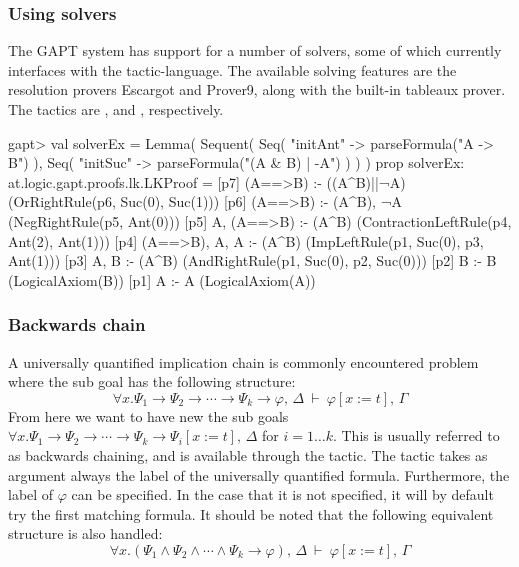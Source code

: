 \documentclass{article}
\newcommand{\cli}[1]{{\ttfamily {#1}}}
\def\fCenter{\ \vdash\ }
\begin{document}
\subsubsection*{Using solvers}
The GAPT system has support for a number of solvers, some of which currently interfaces with the tactic-language. The available solving features are the resolution provers Escargot and Prover9, along with the built-in tableaux prover. The tactics are \cli{escargot}, \cli{prover9} and \cli{prop}, respectively. 

\begin{clilisting}
gapt> val solverEx = Lemma( Sequent( Seq( "initAnt" -> parseFormula("A -> B") ), Seq( "initSuc" -> parseFormula("(A & B) | -A") ) ) ) { prop }
solverEx: at.logic.gapt.proofs.lk.LKProof =
[p7] (A==>B) :- ((A^B)||¬A)    (OrRightRule(p6, Suc(0), Suc(1)))
[p6] (A==>B) :- (A^B), ¬A    (NegRightRule(p5, Ant(0)))
[p5] A, (A==>B) :- (A^B)    (ContractionLeftRule(p4, Ant(2), Ant(1)))
[p4] (A==>B), A, A :- (A^B)    (ImpLeftRule(p1, Suc(0), p3, Ant(1)))
[p3] A, B :- (A^B)    (AndRightRule(p1, Suc(0), p2, Suc(0)))
[p2] B :- B    (LogicalAxiom(B))
[p1] A :- A    (LogicalAxiom(A))
\end{clilisting}

\subsubsection*{Backwards chain}\label{bwchain}
A universally quantified implication chain is commonly encountered problem where the sub goal has the following structure:
$$
\forall x . \Psi_1 \to \Psi_2 \to \cdots \to \Psi_k \to \varphi, \, \Delta \fCenter \varphi[x:=t],\, \Gamma
$$
From here we want to have new the sub goals $\forall x . \Psi_1 \to \Psi_2 \to \cdots \to \Psi_k \to \Psi_i[x:=t],\, \Delta$ for $i = 1 \ldots k$. This is usually referred to as backwards chaining, and is available through the \cli{chain} tactic. The tactic takes as argument always the label of the universally quantified formula. Furthermore, the label of $\varphi$ can be specified. In the case that it is not specified, it will by default try the first matching formula. It should be noted that the following equivalent structure is also handled:
$$
\forall x . (\Psi_1 \wedge \Psi_2 \wedge \cdots \wedge \Psi_k \to \varphi),\, \Delta \fCenter \varphi[x:=t],\, \Gamma
$$
\end{document}

